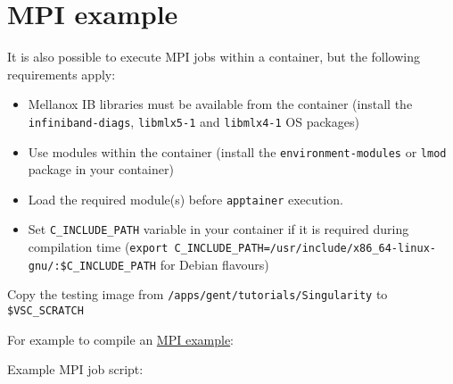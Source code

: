 \section{MPI example}

It is also possible to execute MPI jobs within a container, but the following requirements apply:

\begin{itemize}
    \item Mellanox IB libraries must be available from the container (install the \lstinline|infiniband-diags|, \lstinline|libmlx5-1| and \lstinline|libmlx4-1| OS packages)
    \item Use modules within the container (install the \lstinline|environment-modules| or \lstinline|lmod| package in your container)
    \item Load the required module(s) before \lstinline|apptainer| execution.
    \item Set \lstinline|C_INCLUDE_PATH| variable in your container if it is required during
        compilation time (\lstinline|export C_INCLUDE_PATH=/usr/include/x86_64-linux-gnu/:$C_INCLUDE_PATH| for Debian flavours)
\end{itemize}

Copy the testing image from \lstinline|/apps/gent/tutorials/Singularity| to \lstinline|$VSC_SCRATCH|

\begin{prompt}
\end{prompt}

For example to compile an
\href{https://github.com/open-mpi/ompi/blob/master/examples/ring_c.c}{MPI example}:

\begin{prompt}
\end{prompt}

Example MPI job script:

